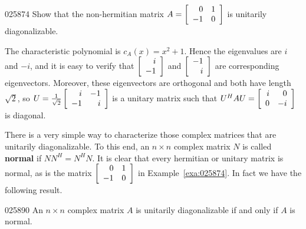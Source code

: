 \begin{example}{}{025874}
Show that the non-hermitian matrix $A = \left[ \begin{array}{rr}
0 & 1 \\
-1 & 0
\end{array}\right]$ is unitarily diagonalizable.


\begin{solution}
  The characteristic polynomial is $c_{A}(x) = x^{2} + 1$. Hence the eigenvalues are $i$ and $-i$, and it is easy to verify that $\left[ \begin{array}{r}
  i \\
  -1
  \end{array}\right]$ and $\left[ \begin{array}{r}
  -1 \\
  i
  \end{array}\right]$ are corresponding eigenvectors. Moreover, these eigenvectors are orthogonal and both have length $\sqrt{2}$, so $U = \tfrac{1}{\sqrt{2}}\left[ \begin{array}{rr}
  i & -1 \\
  -1 & i
  \end{array}\right]$ is a unitary matrix such that $U^HAU = \left[ \begin{array}{rr}
  i & 0 \\
  0 & -i
  \end{array}\right]$ is diagonal.
\end{solution}
\end{example}

There is a very simple way to characterize those complex matrices that are unitarily diagonalizable. To this end, an $n \times n$ complex matrix $N$ is called \textbf{normal} if $NN^{H} = N^{H}N$. It is clear that every hermitian or unitary matrix is normal, as is the matrix $\left[ \begin{array}{rr}
	0 & 1 \\
	-1 & 0
\end{array}\right]$ in Example~\ref{exa:025874}. In fact we have the following result.


\begin{theorem}{}{025890}
An $n \times n$ complex matrix $A$ is unitarily diagonalizable if and only if $A$ is normal.
\end{theorem}

